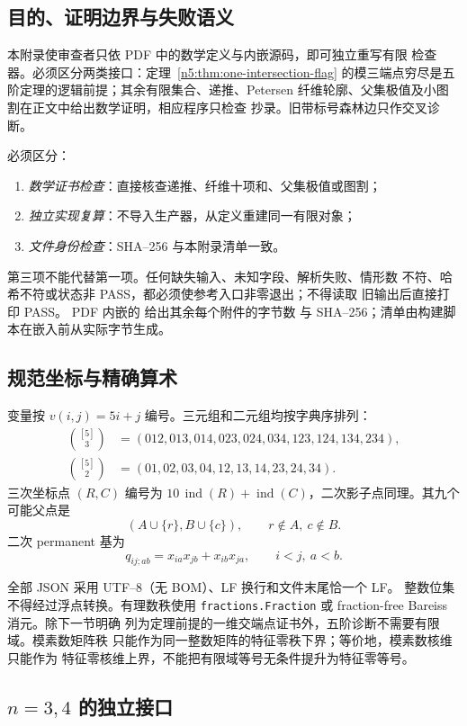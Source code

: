 \subsection{目的、证明边界与失败语义}

本附录使审查者只依 PDF 中的数学定义与内嵌源码，即可独立重写有限
检查器。必须区分两类接口：定理~\ref{n5:thm:one-intersection-flag}
的模三端点穷尽是五阶定理的逻辑前提；其余有限集合、递推、Petersen
纤维轮廓、父集极值及小图割在正文中给出数学证明，相应程序只检查
抄录。旧带标号森林边只作交叉诊断。

必须区分：
\begin{enumerate}[label=(\arabic*)]
\item \emph{数学证书检查}：直接核查递推、纤维十项和、父集极值或图割；
\item \emph{独立实现复算}：不导入生产器，从定义重建同一有限对象；
\item \emph{文件身份检查}：SHA--256 与本附录清单一致。
\end{enumerate}
第三项不能代替第一项。任何缺失输入、未知字段、解析失败、情形数
不符、哈希不符或状态非 PASS，都必须使参考入口非零退出；不得读取
旧输出后直接打印 PASS。
PDF 内嵌的  给出其余每个附件的字节数
与 SHA--256；清单由构建脚本在嵌入前从实际字节生成。

\subsection{规范坐标与精确算术}

变量按 \(v(i,j)=5i+j\) 编号。三元组和二元组均按字典序排列：
\[
\begin{aligned}
\binom{[5]}3&=(012,013,014,023,024,034,123,124,134,234),\\
\binom{[5]}2&=(01,02,03,04,12,13,14,23,24,34).
\end{aligned}
\]
三次坐标点 \((R,C)\) 编号为 \(10\,\operatorname{ind}(R)+
\operatorname{ind}(C)\)，二次影子点同理。其九个可能父点是
\[
(A\cup\{r\},B\cup\{c\}),\qquad r\notin A,\ c\notin B.
\]
二次 permanent 基为
\[
q_{ij;ab}=x_{ia}x_{jb}+x_{ib}x_{ja},\qquad i<j,\ a<b.
\]

全部 JSON 采用 UTF--8（无 BOM）、LF 换行和文件末尾恰一个 LF。
整数位集不得经过浮点转换。有理数秩使用
\texttt{fractions.Fraction} 或 fraction-free Bareiss 消元。除下一节明确
列为定理前提的一维交端点证书外，五阶诊断不需要有限域。模素数矩阵秩
只能作为同一整数矩阵的特征零秩下界；等价地，模素数核维只能作为
特征零核维上界，不能把有限域等号无条件提升为特征零等号。

\subsection{\texorpdfstring{\(n=3,4\)}{n=3,4} 的独立接口}

